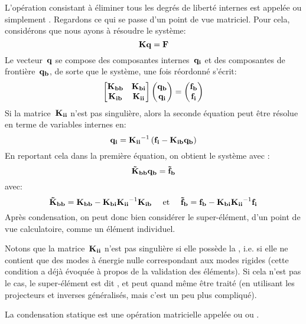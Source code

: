 L'opération consistant à éliminer tous les degrés de liberté internes est appelée  ou simplement .
\medskipvm
Regardons ce qui se passe d'un point de vue matriciel.
Pour cela, considérons que nous ayons à résoudre le système:
\begin{equation} \MM{K} \VV{q}=\VV{F}\end{equation}
Le vecteur~$\VV{q}$ se compose des composantes internes~$\VV{q_i}$ et des composantes
de frontière~$\VV{q_b}$, de sorte que le système, une fois réordonné s'écrit:
\begin{equation}
\MM*{\MM{K_{bb}} & \MM{K_{bi}}\\
\MM{K_{ib}} & \MM{K_{ii}}}
\VV*{\VV{q_b}\\\VV{q_i}}
=
\VV*{\VV{f_b}\\\VV{f_i}}
\end{equation}
Si la matrice~$\MM{K_{ii}}$ n'est pas singulière, alors la seconde équation peut être résolue en terme de variables internes en:
\begin{equation}
\VV{q_i} = \MMI{K_{ii}}\left(\VV{f_i}-\MM{K_{ib}}\VV{q_b}\right)
\end{equation}
En reportant cela dans la première équation, on obtient le système avec :
\begin{equation}
\MM{\tilde{K}_{bb}}\VV{q_b} = \VV{\tilde{f}_b}
\end{equation}
avec:
\begin{equation}
\MM{\tilde{K}_{bb}}=\MM{K_{bb}} - \MM{K_{bi}}\MMI{K_{ii}}\MM{K_{ib}}
\quad \text{ et }\quad
\VV{\tilde{f}_b}=\VV{f_b} - \MM{K_{bi}}\MMI{K_{ii}}\VV{f_i}
\end{equation}
Après condensation, on peut donc bien considérer le super-élément, d'un point de vue calculatoire, comme un élément individuel.

\medskip
Notons que la matrice~$\MM{K_{ii}}$ n'est pas singulière si elle possède la , i.e. si elle ne contient que des modes à énergie nulle correspondant aux modes rigides (cette condition a déjà évoquée à propos de la validation des éléments). Si cela n'est pas le cas, le super-élément est dit , et peut quand même être traité (en utilisant les projecteurs et inverses généralisés, mais c'est un peu plus compliqué).

La condensation statique est une opération matricielle appelée  ou  ou .

